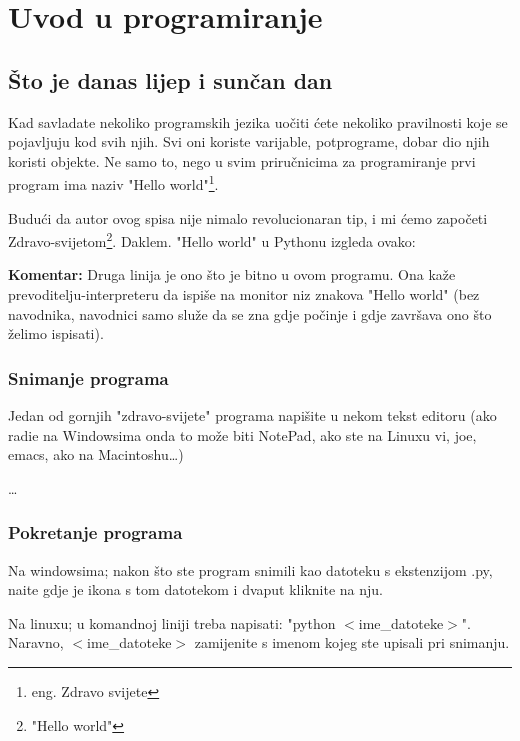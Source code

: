 \chapter{Uvod u programiranje}

\section{\v{S}to je danas lijep i sun\v{c}an dan}

Kad savladate nekoliko programskih jezika uo\v{c}iti \'{c}ete
nekoliko pravilnosti koje se pojavljuju kod svih njih. Svi oni
koriste varijable, potprograme, dobar dio njih koristi objekte. Ne
samo to, nego u svim priru\v{c}nicima za programiranje prvi program
ima naziv "Hello world"\footnote{eng.  Zdravo svijete}.

Budu\'{c}i da autor ovog spisa nije nimalo revolucionaran tip, i
mi \'{c}emo zapo\v{c}eti Zdravo-svijetom\footnote{\hspace*{2mm}"Hello
world"}.  Daklem. "Hello world" u Pythonu izgleda ovako:


\textbf{Komentar:} Druga linija je ono \v{s}to je bitno u ovom
programu. Ona ka\v{z}e prevoditelju-interpreteru da ispi\v{s}e na
monitor niz znakova "Hello world" (bez navodnika, navodnici samo
slu\v{z}e da se zna gdje po\v{c}inje i gdje zavr\v{s}ava ono \v{s}to
\v{z}elimo ispisati).

\subsection{Snimanje programa}

Jedan od gornjih "zdravo-svijete" programa napi\v{s}ite u nekom
tekst editoru (ako radie na Windowsima onda to mo\v{z}e biti NotePad,
ako ste na Linuxu vi, joe, emacs, ako na Macintoshu\dots)

\dots

\subsection{Pokretanje programa}

Na windowsima; nakon \v{s}to ste program snimili kao datoteku s ekstenzijom
.py, na\dj{}ite gdje je ikona s tom datotekom i dvaput kliknite na nju.

Na linuxu; u komandnoj liniji treba napisati: "python $<$ime\_datoteke$>$".
Naravno, $<$ime\_datoteke$>$ zamijenite s imenom kojeg ste upisali pri
snimanju.

